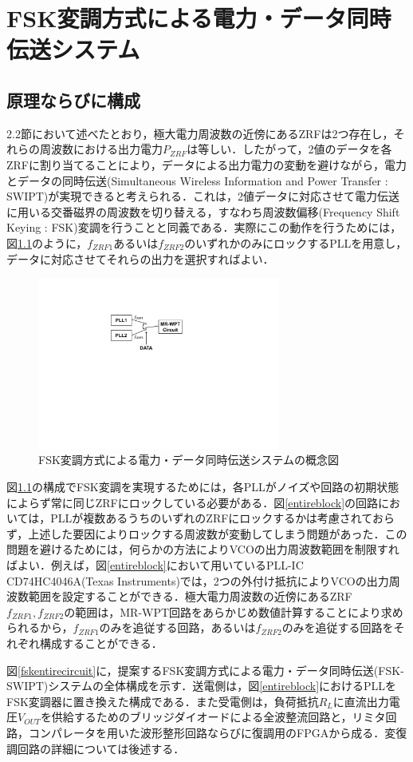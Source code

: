 \chapter{FSK変調方式による電力・データ同時伝送システム}
\section{原理ならびに構成}
2.2節において述べたとおり，極大電力周波数の近傍にあるZRFは2つ存在し，それらの周波数における出力電力$P_{ZRF}$は等しい．したがって，2値のデータを各ZRFに割り当てることにより，データによる出力電力の変動を避けながら，電力とデータの同時伝送(Simultaneous Wireless Information and Power Transfer : SWIPT)が実現できると考えられる．これは，2値データに対応させて電力伝送に用いる交番磁界の周波数を切り替える，すなわち周波数偏移(Frequency Shift Keying : FSK)変調を行うことと同義である．実際にこの動作を行うためには，図\ref{concept}のように，$f_{ZRF1}$あるいは$f_{ZRF2}$のいずれかのみにロックするPLLを用意し，データに対応させてそれらの出力を選択すればよい．

\begin{figure}[b]
\begin{center}

\includegraphics[width=80mm]{figures/concept.pdf}
\caption{FSK変調方式による電力・データ同時伝送システムの概念図}
\label{concept}
\end{center}

\end{figure}

図\ref{concept}の構成でFSK変調を実現するためには，各PLLがノイズや回路の初期状態によらず常に同じZRFにロックしている必要がある．図\ref{entireblock}の回路においては，PLLが複数あるうちのいずれのZRFにロックするかは考慮されておらず，上述した要因によりロックする周波数が変動してしまう問題があった．この問題を避けるためには，何らかの方法によりVCOの出力周波数範囲を制限すればよい．例えば，図\ref{entireblock}において用いているPLL-IC CD74HC4046A(Texas Instruments)では，2つの外付け抵抗によりVCOの出力周波数範囲を設定することができる\cite{4046}．極大電力周波数の近傍にあるZRF$f_{ZRF1}, f_{ZRF2}$の範囲は，MR-WPT回路をあらかじめ数値計算することにより求められるから，$f_{ZRF1}$のみを追従する回路，あるいは$f_{ZRF2}$のみを追従する回路をそれぞれ構成することができる．\par
図\ref{fskentirecircuit}に，提案するFSK変調方式による電力・データ同時伝送(FSK-SWIPT)システムの全体構成を示す．送電側は，図\ref{entireblock}におけるPLLをFSK変調器に置き換えた構成である．また受電側は，負荷抵抗$R_L$に直流出力電圧$V_{OUT}$を供給するためのブリッジダイオードによる全波整流回路と，リミタ回路，コンパレータを用いた波形整形回路ならびに復調用のFPGAから成る．変復調回路の詳細については後述する．

